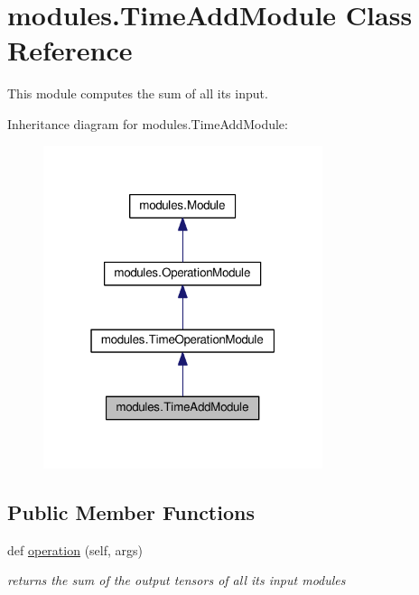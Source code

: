 \hypertarget{classmodules_1_1_time_add_module}{}\section{modules.\+Time\+Add\+Module Class Reference}
\label{classmodules_1_1_time_add_module}


This module computes the sum of all its input.  




Inheritance diagram for modules.\+Time\+Add\+Module\+:\nopagebreak
\begin{figure}[H]
\begin{center}
\leavevmode
\includegraphics[width=232pt]{classmodules_1_1_time_add_module__inherit__graph}
\end{center}
\end{figure}
\subsection*{Public Member Functions}
\begin{DoxyCompactItemize}
\item 
\mbox{\label{classmodules_1_1_time_add_module_a85acb5bdfffdc3a65cbcef78d022310f}} 
def \hyperlink{classmodules_1_1_time_add_module_a85acb5bdfffdc3a65cbcef78d022310f}{operation} (self, args)
\begin{DoxyCompactList}\small\item\em returns the sum of the output tensors of all its input modules \end{DoxyCompactList}\end{DoxyCompactItemize}
